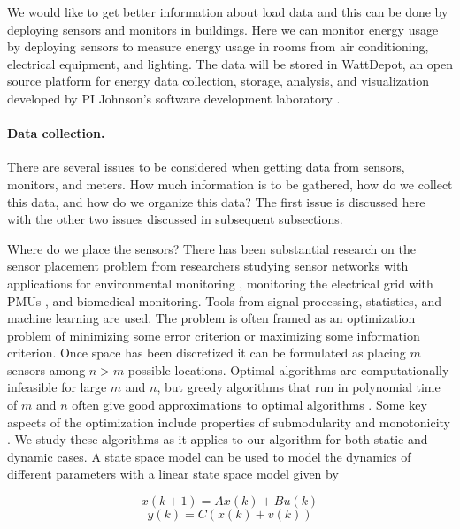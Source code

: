 We would like to get better information about load data and this can be
done by deploying sensors and monitors in buildings.  Here we can monitor
energy usage by deploying sensors to measure energy usage in rooms from air
conditioning, electrical equipment, and lighting. The data will be stored
in WattDepot, an open source platform for energy data collection, storage,
analysis, and visualization developed by PI Johnson's software development 
laboratory \cite{csdl2-10-05}.
 
\paragraph{Data collection.}

There are several issues to be considered when getting data from sensors,
monitors, and meters.  How much information is to be gathered, how do we
collect this data, and how do we organize this data?  The first issue is
discussed here with the other two issues discussed in subsequent
subsections.

Where do we place the sensors?  There has been substantial research on the
sensor placement problem from researchers studying sensor networks with
applications for environmental monitoring \cite{dhillon2,dhillon3},
monitoring the electrical grid with PMUs \cite{chen-abur,xu-abur}, and
biomedical monitoring.  Tools from signal processing, statistics, and
machine learning are used.  The problem is often framed as an optimization
problem of minimizing some error criterion or maximizing some information
criterion.  Once space has been discretized it can be formulated as placing
$m$ sensors among $n>m$ possible locations.  Optimal algorithms are
computationally infeasible for large $m$ and $n$, but greedy algorithms
that run in polynomial time of $m$ and $n$ often give good approximations
to optimal algorithms \cite{li-negi-ilic,krause-singh-guestrin}.  Some key
aspects of the optimization include properties of submodularity and
monotonicity \cite{nwf}.  We study these algorithms as it applies to our
algorithm for both static and dynamic cases.  A state space model can be
used to model the dynamics of different parameters with a linear state
space model given by

\begin{displaymath}
x(k+1) = A x(k) + B u(k)
\end{displaymath}
\begin{displaymath}
y(k) = C (x(k) + v(k))
\end{displaymath}

